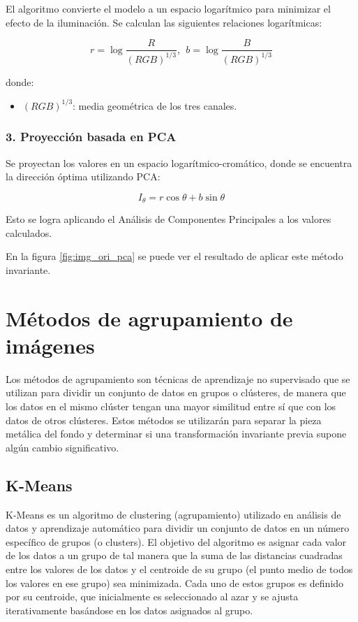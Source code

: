 El algoritmo convierte el modelo a un espacio logarítmico para minimizar el efecto de la iluminación. Se calculan las siguientes relaciones logarítmicas:

$$r=\log \frac{R}{(RGB)^{1/3} },~~b=\log \frac{B}{(RGB)^{1/3} }$$

donde:

\begin{itemize}
\setlength{\itemsep}{-1ex}
   \item{\begin{flushleft} $(RGB)^{1/3}$: media geométrica de los tres canales. \end{flushleft}}
\end{itemize}

\subsubsection{3. Proyección basada en PCA}

Se proyectan los valores en un espacio logarítmico-cromático, donde se encuentra la dirección óptima utilizando PCA:

$$I_{\theta } =r\cos \theta +b\sin \theta$$

Esto se logra aplicando el Análisis de Componentes Principales a los valores calculados.

En la figura \ref{fig:img_ori_pca} se puede ver el resultado de aplicar este método invariante.

\section{Métodos de agrupamiento de imágenes}\label{metodos-de-agrupamiento-de-imagenes}

Los métodos de agrupamiento son técnicas de aprendizaje no supervisado que se utilizan para dividir un conjunto de datos en grupos o clústeres, de manera que los datos en el mismo clúster tengan una mayor similitud entre sí que con los datos de otros clústeres. Estos métodos se utilizarán para separar la pieza metálica del fondo y determinar si una transformación invariante previa supone algún cambio significativo.

\subsection{K-Means}\label{k-means}

K-Means \cite{MATLAB:2023bKmeans} es un algoritmo de clustering (agrupamiento) utilizado en análisis de datos y aprendizaje automático para dividir un conjunto de datos en un número específico de grupos (o clusters). El objetivo del algoritmo es asignar cada valor de los datos a un grupo de tal manera que la suma de las distancias cuadradas entre los valores de los datos y el centroide de su grupo (el punto medio de todos los valores en ese grupo) sea minimizada. Cada uno de estos grupos es definido por su centroide, que inicialmente es seleccionado al azar y se ajusta iterativamente basándose en los datos asignados al grupo.

